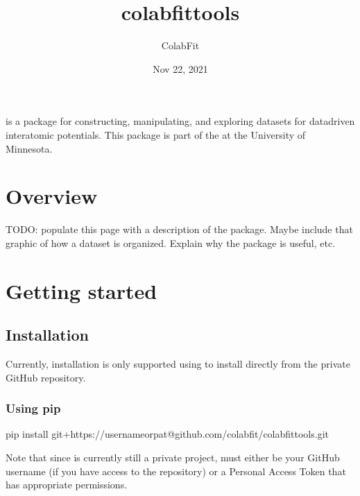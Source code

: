 \documentclass[letterpaper,10pt,english]{sphinxmanual}
\title{colabfit\sphinxhyphen{}tools}
\date{Nov 22, 2021}
\author{ColabFit}
\begin{document}
\pagestyle{empty}
\sphinxmaketitle
\pagestyle{plain}
\sphinxtableofcontents
\pagestyle{normal}
\label{\detokenize{index::doc}}


\sphinxAtStartPar
{} is a package for constructing, manipulating, and
exploring datasets for data\sphinxhyphen{}driven interatomic potentials. This package is part
of the  at the University of
Minnesota.


\chapter{Overview}
\label{\detokenize{overview:overview}}\label{\detokenize{overview::doc}}
\sphinxAtStartPar
TODO: populate this page with a description of the package. Maybe include that
graphic of how a dataset is organized. Explain why the package is useful, etc.


\chapter{Getting started}
\label{\detokenize{getting_started:getting-started}}\label{\detokenize{getting_started::doc}}

\section{Installation}
\label{\detokenize{getting_started:installation}}
\sphinxAtStartPar
Currently, installation is only supported using  to install directly
from the private GitHub repository.


\subsection{Using pip}
\label{\detokenize{getting_started:using-pip}}
\begin{sphinxVerbatim}[commandchars=\\\{\}]
pip install git+https://\PYGZlt{}username\PYGZus{}or\PYGZus{}pat\PYGZgt{}@github.com/colabfit/colabfit\PYGZhy{}tools.git
\end{sphinxVerbatim}

\sphinxAtStartPar
Note that since  is currently still a private project,
 must either be your GitHub username (if you have access to the repository) or a
Personal Access Token that has appropriate permissions.
\end{document}
